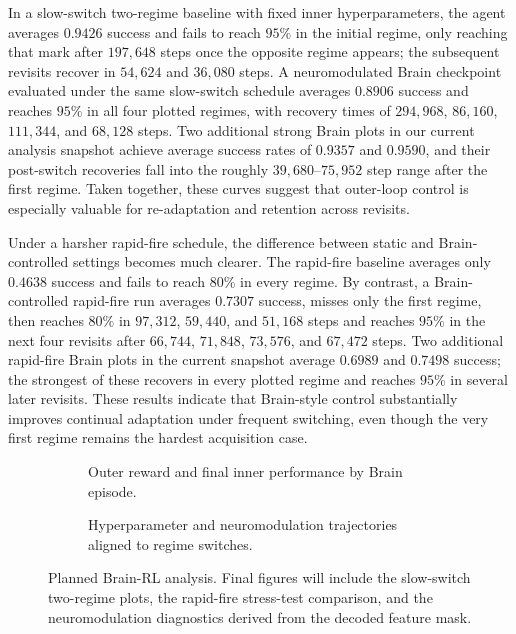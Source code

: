 ﻿\documentclass[sigconf]{acmart}
\begin{document}
In a slow-switch two-regime baseline with fixed inner hyperparameters, the agent averages $0.9426$ success and fails to reach $95\%$ in the initial regime, only reaching that mark after $197{,}648$ steps once the opposite regime appears; the subsequent revisits recover in $54{,}624$ and $36{,}080$ steps. A neuromodulated Brain checkpoint evaluated under the same slow-switch schedule averages $0.8906$ success and reaches $95\%$ in all four plotted regimes, with recovery times of $294{,}968$, $86{,}160$, $111{,}344$, and $68{,}128$ steps. Two additional strong Brain plots in our current analysis snapshot achieve average success rates of $0.9357$ and $0.9590$, and their post-switch recoveries fall into the roughly $39{,}680$--$75{,}952$ step range after the first regime. Taken together, these curves suggest that outer-loop control is especially valuable for re-adaptation and retention across revisits.

Under a harsher rapid-fire schedule, the difference between static and Brain-controlled settings becomes much clearer. The rapid-fire baseline averages only $0.4638$ success and fails to reach $80\%$ in every regime. By contrast, a Brain-controlled rapid-fire run averages $0.7307$ success, misses only the first regime, then reaches $80\%$ in $97{,}312$, $59{,}440$, and $51{,}168$ steps and reaches $95\%$ in the next four revisits after $66{,}744$, $71{,}848$, $73{,}576$, and $67{,}472$ steps. Two additional rapid-fire Brain plots in the current snapshot average $0.6989$ and $0.7498$ success; the strongest of these recovers in every plotted regime and reaches $95\%$ in several later revisits. These results indicate that Brain-style control substantially improves continual adaptation under frequent switching, even though the very first regime remains the hardest acquisition case.

\begin{figure}[t]
  \centering
  \begin{subfigure}{\linewidth}
    \centering
    \caption{Outer reward and final inner performance by Brain episode.}
    \label{fig:brain_outer_reward}
  \end{subfigure}
  \vspace{0.5em}
  \begin{subfigure}{\linewidth}
    \centering
    \caption{Hyperparameter and neuromodulation trajectories aligned to regime switches.}
    \label{fig:brain_hyperparams}
  \end{subfigure}
  \caption{Planned Brain-RL analysis. Final figures will include the slow-switch two-regime plots, the rapid-fire stress-test comparison, and the neuromodulation diagnostics derived from the decoded feature mask.}
  \label{fig:brain_analysis}
\end{figure}
\end{document}
